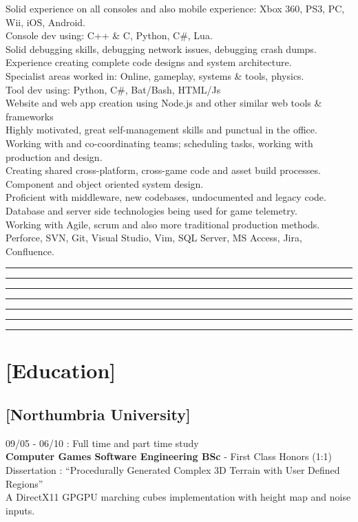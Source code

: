 \documentclass[a4paper]{res}
\newcommand{\setrule}[1]{\rule{#1}{1mm}}
\newcommand{\fibrule}[2]{ \hspace{#1}  \setrule{#2} \setrule{21mm} \setrule{13mm} \setrule{8mm} \setrule{5mm} \setrule{3mm} \setrule{2mm}  \vspace{-.52in} }
\begin{document}
\begin{resume}
Solid experience on all consoles and also mobile experience: Xbox 360, PS3, PC, Wii, iOS, Android. \\
Console dev using: C++ \& C, Python, C\#, Lua. \\
Solid debugging skills, debugging network issues, debugging crash dumps. \\
Experience creating complete code designs and system architecture. \\
Specialist areas worked in: Online, gameplay, systems \& tools, physics. \\
Tool dev using: Python, C\#, Bat/Bash, HTML/Js \\
Website and web app creation using Node.js and other similar web tools \& frameworks \\
Highly motivated, great self-management skills and punctual in the office. \\
Working with and co-coordinating teams; scheduling tasks, working with production and design.  \\
Creating shared cross-platform, cross-game code and asset build processes. \\
Component and object oriented system design. \\
Proficient with middleware, new codebases, undocumented and legacy code.  \\
Database and server side technologies being used for game telemetry.\\
Working with Agile, scrum and also more traditional production methods. \\
Perforce, SVN, Git, Visual Studio, Vim, SQL Server, MS Access, Jira, Confluence.

\fibrule{0.9in}{3.0in}
\section{[Education]} 

\vspace{-.12in}

\subsection{[Northumbria University]} 09/05 - 06/10 : Full time and part time study\\
{\bf Computer Games Software Engineering BSc} -  First Class Honors (1:1) \\
Dissertation : ``Procedurally Generated Complex 3D Terrain with User Defined Regions'' \\
A DirectX11 GPGPU marching cubes implementation with height map and noise inputs.


\end{resume}
\end{document}
